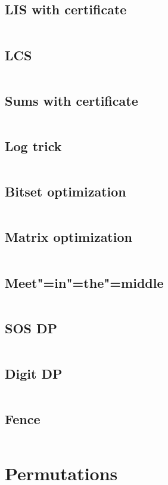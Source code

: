 ﻿\documentclass[10pt,twocolumn,oneside]{article}
\begin{document}
\subsection{LIS with certificate}
\inputminted[breaklines]{cpp}{DP/lis with certificate.cpp}
\subsection{LCS}
\inputminted[breaklines]{python}{DP/lcs.py}
\subsection{Sums with certificate}
\inputminted[breaklines]{python}{DP/sums with certificate.py}
\subsection{Log trick}
\inputminted[breaklines]{cpp}{DP/log-trick.cpp}
\subsection{Bitset optimization}
\inputminted[breaklines]{cpp}{DP/bitset optimization.cpp}
\subsection{Matrix optimization}
\inputminted[breaklines]{cpp}{DP/matrix optimization.cpp}
\subsection{Meet"=in"=the"=middle}
\inputminted[breaklines]{cpp}{DP/meet-in-the-middle.cpp}
\subsection{SOS DP}
\inputminted[breaklines]{cpp}{DP/sos-dp.cpp}
\subsection{Digit DP}
\inputminted[breaklines]{cpp}{DP/digit dp.cpp}
\subsection{Fence}
\inputminted[breaklines]{cpp}{DP/fence.cpp}

\section{Permutations}
\end{document}
